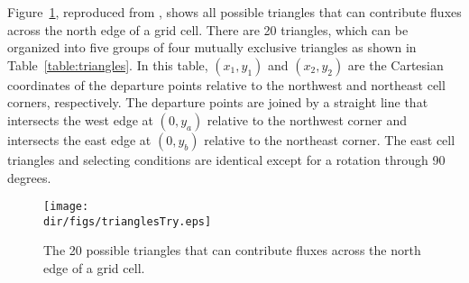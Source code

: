 Figure~\ref{fig:gliss.triangles}, reproduced from \citet{Dukowicz2000}, shows all possible
triangles that can contribute fluxes across the north edge of a
grid cell.  There are 20 triangles, which can be organized into
five groups of four mutually exclusive triangles as shown in
Table~\ref{table:triangles}. In this table, $(x_1, y_1)$ and $(x_2,y_2)$ are the
Cartesian coordinates of the departure points relative to the
northwest and northeast cell corners, respectively.  The departure
points are joined by a straight line that intersects the west edge
at $(0,y_a)$ relative to the northwest corner and intersects the
east edge at $(0,y_b)$ relative to the northeast corner. The east cell
triangles and selecting conditions are identical except for a
rotation through 90 degrees.


\begin{figure}
 \begin{center}
    \texttt{[image: \\dir/figs/trianglesTry.eps]}
 \end{center}
  \caption{The 20 possible triangles that can
    contribute fluxes across the north edge of a grid cell.}
  \label{fig:gliss.triangles}
\end{figure}


